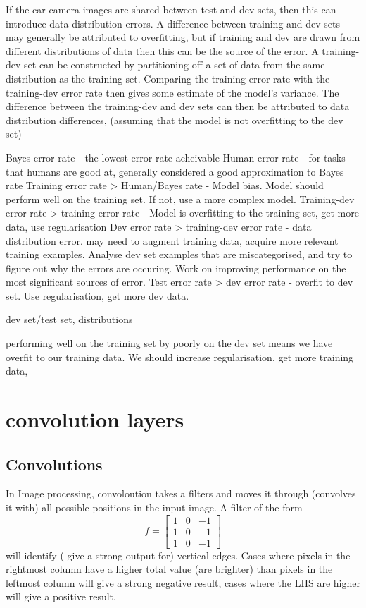 \documentclass{article}
\begin{document}
If the car camera images are shared between test and dev sets, then this can introduce data-distribution errors. A difference between training and dev sets may generally be attributed to overfitting, but if training and dev are drawn from different distributions of data then this can be the source of the error. A training-dev set can be constructed by partitioning off a set of data from the same distribution as the training set. Comparing the training error rate with the training-dev error rate then gives some estimate of the model's variance. The difference between the training-dev and dev sets can then be attributed to data distribution differences, (assuming that the model is not overfitting to the dev set)

Bayes error rate - the lowest error rate acheivable
Human error rate - for tasks that humans are good at, generally considered a good approximation to Bayes rate
Training error rate > Human/Bayes rate - Model bias. Model should perform well on the training set. If not, use a more complex model.
Training-dev error rate > training error rate - Model is overfitting to the training set, get more data, use regularisation
Dev error rate > training-dev error rate - data distribution error. may need to augment training data, acquire more relevant training examples. Analyse dev set examples that are miscategorised, and try to figure out why the errors are occuring. Work on improving performance on the most significant sources of error.
Test error rate > dev error rate - overfit to dev set. Use regularisation, get more dev data.

dev set/test set, distributions

performing well on the training set by poorly on the dev set means we have overfit to our training data. We should increase regularisation, get more training data, 

\section{convolution layers}
\subsection{Convolutions}
In Image processing, convoloution takes a filters and moves it through (convolves it with) all possible positions in the input image. A filter of the form
\begin{equation}
f = \left[ \begin{array}{ccc}
1 & 0 & -1 \\
1 & 0 & -1 \\
1 & 0 & -1 
\end{array} \right]
\end{equation}
will identify ( give a strong output for) vertical edges. Cases where pixels in the rightmost column have a higher total value (are brighter) than pixels in the leftmost column will give a strong negative result, cases where the LHS are higher will give a positive result.
\end{document}
